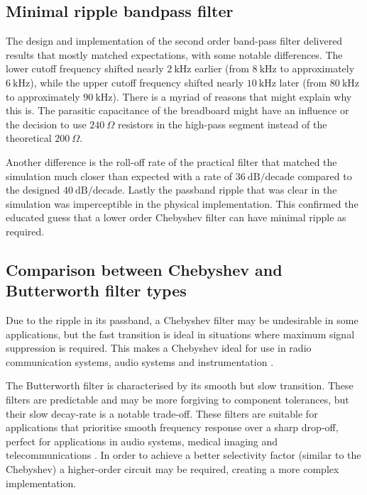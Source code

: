 \documentclass[a4paper, onecolumn, 12pt]{IEEEtran}
\begin{document}

\subsection{Minimal ripple bandpass filter}
The design and implementation of the second order band-pass filter delivered results that mostly matched expectations, with some notable differences. The lower cutoff frequency shifted nearly $2~\text{kHz}$ earlier (from $8~\text{kHz}$ to approximately $6~\text{kHz}$), while the upper cutoff frequency shifted nearly $10~\text{kHz}$ later (from $80~\text{kHz}$ to approximately $90~\text{kHz}$). There is a myriad of reasons that might explain why this is. The parasitic capacitance of the breadboard might have an influence or the decision to use $240~\Omega$ resistors in the high-pass segment instead of the theoretical $200~\Omega$.

Another difference is the roll-off rate of the practical filter that matched the simulation much closer than expected with a rate of $36~\text{dB/decade}$ compared to the designed $40~\text{dB/decade}$. Lastly the passband ripple that was clear in the simulation was imperceptible in the physical implementation. This confirmed the educated guess that a lower order Chebyshev filter can have minimal ripple as required.

\subsection{Comparison between Chebyshev and Butterworth filter types}
Due to the ripple in its passband, a Chebyshev filter may be undesirable in some applications, but the fast transition is ideal in situations where maximum signal suppression is required. This makes a Chebyshev ideal for use in radio communication systems, audio systems and instrumentation \cite{chebyshev_butterworth_comparison}.

The Butterworth filter is characterised by its smooth but slow transition. These filters are predictable and may be more forgiving to component tolerances, but their slow decay-rate is a notable trade-off. These filters are suitable for applications that prioritise smooth frequency response over a sharp drop-off, perfect for applications in audio systems, medical imaging and telecommunications \cite{chebyshev_butterworth_comparison}. In order to achieve a better selectivity factor (similar to the Chebyshev) a higher-order circuit may be required, creating a more complex implementation. 
\end{document}
